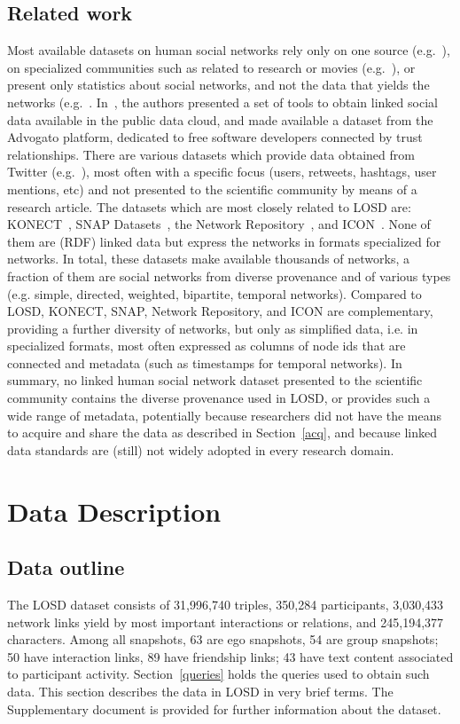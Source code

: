 \documentclass[data,datadescriptor,submit,moreauthors,pdftex]{Definitions/mdpi}
\begin{document}
\subsection{Related work}\label{srel}
Most available datasets on human social networks rely only on one source (e.g.~\cite{nat,fb1}),
on specialized communities such as related to research or movies (e.g.~\cite{s1}),
or present only statistics about social networks, and not the data that yields the networks (e.g.~\cite{st1}.
In~\cite{foaf1}, the authors presented a set of tools to obtain linked social data available in the public data cloud,
and made available a dataset from the Advogato platform,
dedicated to free software developers connected by trust relationships.
There are various datasets which provide data obtained from Twitter (e.g.~\cite{tw1,tw2}),
most often with a specific focus (users, retweets, hashtags, user mentions, etc)
and not presented to the scientific community by means of a research article.
The datasets which are most closely related to LOSD are: KONECT~\cite{konect},
SNAP Datasets~\cite{snapnets}, the Network Repository~\cite{nr}, and ICON~\cite{icon}.
None of them are (RDF) linked data but express the networks in formats specialized for networks.
In total, these datasets make available thousands of networks,
a fraction of them are social networks from diverse provenance and
of various types (e.g. simple, directed, weighted, bipartite, temporal networks).
Compared to LOSD, KONECT, SNAP, Network Repository, and ICON are complementary, providing a further diversity of networks,
but only as simplified data, i.e. in specialized formats, most often expressed as columns of node ids
that are connected and metadata (such as timestamps for temporal networks).
In summary, no linked human social network dataset presented to the
scientific community contains the diverse provenance used in LOSD,
or provides such a wide range of metadata,
potentially because researchers did not have the means to acquire and
share the data as described in Section~\ref{acq},
and because linked data standards are (still) not widely adopted in 
every research domain.

\section{Data Description}\label{materials}
\subsection{Data outline}\label{outline}
The LOSD dataset consists of 31,996,740 triples, 350,284 participants,
3,030,433 network links yield by most important interactions or relations, and 245,194,377 characters.
Among all snapshots, 63 are ego snapshots, 54 are group snapshots; 50 have interaction links,
89 have friendship links; 43 have text content associated to participant activity.
Section~\ref{queries} holds the queries used to obtain such data.
This section describes the data in LOSD in very brief terms.
The Supplementary document is provided for further information about the dataset.
\end{document}
